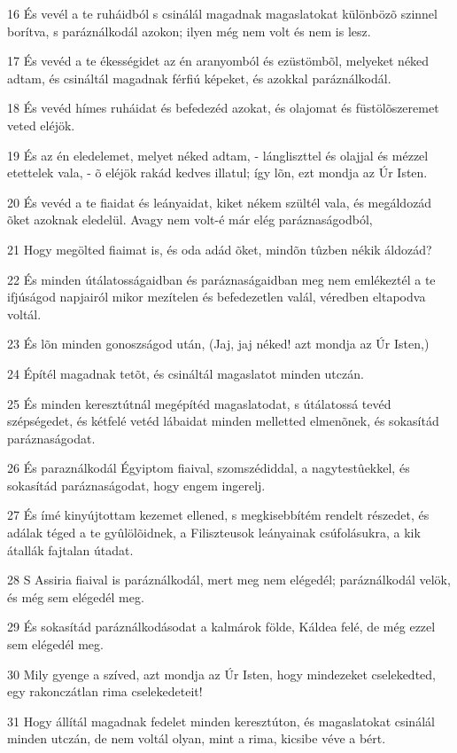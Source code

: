 \par 16 És vevél a te ruháidból s csinálál magadnak magaslatokat különbözõ szinnel borítva, s paráználkodál azokon; ilyen még nem volt és nem is lesz.
\par 17 És vevéd a te ékességidet az én aranyomból és ezüstömbõl, melyeket néked adtam, és csináltál magadnak férfiú képeket, és azokkal paráználkodál.
\par 18 És vevéd hímes ruháidat és befedezéd azokat, és olajomat és füstölõszeremet veted eléjök.
\par 19 És az én eledelemet, melyet néked adtam, - lángliszttel és olajjal és mézzel etettelek vala, - õ eléjök rakád kedves illatul; így lõn, ezt mondja az Úr Isten.
\par 20 És vevéd a te fiaidat és leányaidat, kiket nékem szültél vala, és megáldozád õket azoknak eledelül. Avagy nem volt-é már elég paráznaságodból,
\par 21 Hogy megölted fiaimat is, és oda adád õket, mindõn tûzben nékik áldozád?
\par 22 És minden útálatosságaidban és paráznaságaidban meg nem emlékeztél a te ifjúságod napjairól mikor mezítelen és befedezetlen valál, véredben eltapodva voltál.
\par 23 És lõn minden gonoszságod után, (Jaj, jaj néked! azt mondja az Úr Isten,)
\par 24 Építél magadnak tetõt, és csináltál magaslatot minden utczán.
\par 25 És minden keresztútnál megépítéd magaslatodat, s útálatossá tevéd szépségedet, és kétfelé vetéd lábaidat minden melletted elmenõnek, és sokasítád paráznaságodat.
\par 26 És paraználkodál Égyiptom fiaival, szomszédiddal, a nagytestûekkel, és sokasítád paráznaságodat, hogy engem ingerelj.
\par 27 És ímé kinyújtottam kezemet ellened, s megkisebbítém rendelt részedet, és adálak téged a te gyûlölõidnek, a Filiszteusok leányainak csúfolásukra, a kik átallák fajtalan útadat.
\par 28 S Assiria fiaival is paráználkodál, mert meg nem elégedél; paráználkodál velök, és még sem elégedél meg.
\par 29 És sokasítád paráználkodásodat a kalmárok földe, Káldea felé, de még ezzel sem elégedél meg.
\par 30 Mily gyenge a szíved, azt mondja az Úr Isten, hogy mindezeket cselekedted, egy rakonczátlan rima cselekedeteit!
\par 31 Hogy állítál magadnak fedelet minden keresztúton, és magaslatokat csinálál minden utczán, de nem voltál olyan, mint a rima, kicsibe véve a bért.
